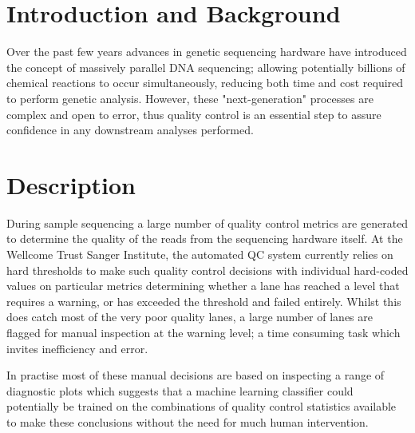 

\section{Introduction and Background}
Over the past few years advances in genetic sequencing hardware have introduced the concept of massively parallel DNA sequencing; allowing potentially billions of chemical reactions to occur simultaneously, reducing both time and cost required to perform genetic analysis\citep{HMG}. However, these "next-generation" processes are complex and open to error\citep{Illumina}, thus quality control is an essential step to assure confidence in any downstream analyses performed.


\section{Description}
During sample sequencing a large number of quality control metrics are generated to determine the quality of the reads from the sequencing hardware itself. At the Wellcome Trust Sanger Institute, the automated QC system currently relies on hard thresholds to make such quality control decisions with individual hard-coded values on particular metrics determining whether a lane has reached a level that requires a warning, or has exceeded the threshold and failed entirely. Whilst this does catch most of the very poor quality lanes, a large number of lanes are flagged for manual inspection at the warning level; a time consuming task which invites inefficiency and error.

In practise most of these manual decisions are based on inspecting a range of diagnostic plots which suggests that a machine learning classifier could potentially be trained on the combinations of quality control statistics available to make these conclusions without the need for much human intervention.


